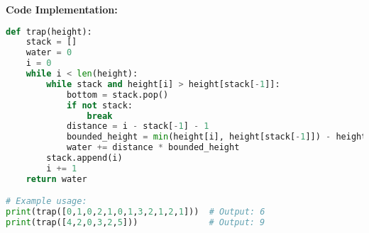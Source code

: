\textbf{Code Implementation:}

\begin{lstlisting}[language=Python]
def trap(height):
    stack = []
    water = 0
    i = 0
    while i < len(height):
        while stack and height[i] > height[stack[-1]]:
            bottom = stack.pop()
            if not stack:
                break
            distance = i - stack[-1] - 1
            bounded_height = min(height[i], height[stack[-1]]) - height[bottom]
            water += distance * bounded_height
        stack.append(i)
        i += 1
    return water

# Example usage:
print(trap([0,1,0,2,1,0,1,3,2,1,2,1]))  # Output: 6
print(trap([4,2,0,3,2,5]))              # Output: 9
\end{lstlisting}